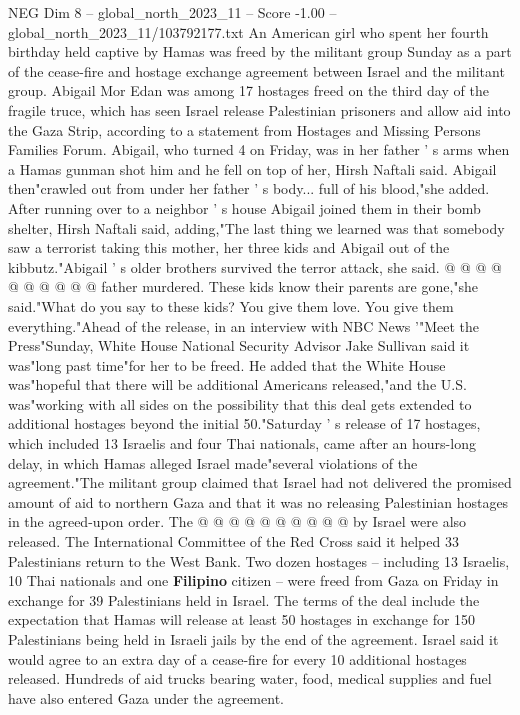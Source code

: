 \begin{textsample}{NEG Dim 8 – global\_north\_2023\_11 – Score -1.00 – global\_north\_2023\_11/103792177.txt}  \label{ex:f8_neg_265}
An American girl who spent her fourth birthday held captive by Hamas was freed by the militant group Sunday as a part of the cease-fire and hostage exchange agreement between Israel and the militant group.
Abigail Mor Edan was among 17 hostages freed on the third day of the fragile truce, which has seen Israel release Palestinian prisoners and allow aid into the Gaza Strip, according to a statement from Hostages and Missing Persons Families Forum.
Abigail, who turned 4 on Friday, was in her father ' s arms when a Hamas gunman shot him and he fell on top of her, Hirsh Naftali said.
Abigail then"crawled out from under her father ' s body... full of his blood,"she added.
After running over to a neighbor ' s house Abigail joined them in their bomb shelter, Hirsh Naftali said, adding,"The last thing we learned was that somebody saw a terrorist taking this mother, her three kids and Abigail out of the kibbutz."Abigail ' s older brothers survived the terror attack, she said. @ @ @ @ @ @ @ @ @ @ father murdered.
These kids know their parents are gone,"she said."What do you say to these kids?
You give them love.
You give them everything."Ahead of the release, in an interview with NBC News '"Meet the Press"Sunday, White House National Security Advisor Jake Sullivan said it was"long past time"for her to be freed.
He added that the White House was"hopeful that there will be additional Americans released,"and the U.S. was"working with all sides on the possibility that this deal gets extended to additional hostages beyond the initial 50."Saturday ' s release of 17 hostages, which included 13 Israelis and four Thai nationals, came after an hours-long delay, in which Hamas alleged Israel made"several violations of the agreement."The militant group claimed that Israel had not delivered the promised amount of aid to northern Gaza and that it was no releasing Palestinian hostages in the agreed-upon order.
The @ @ @ @ @ @ @ @ @ @ by Israel were also released.
The International Committee of the Red Cross said it helped 33 Palestinians return to the West Bank.
Two dozen hostages -- including 13 Israelis, 10 Thai nationals and one \textbf{Filipino} citizen -- were freed from Gaza on Friday in exchange for 39 Palestinians held in Israel.
The terms of the deal include the expectation that Hamas will release at least 50 hostages in exchange for 150 Palestinians being held in Israeli jails by the end of the agreement.
Israel said it would agree to an extra day of a cease-fire for every 10 additional hostages released.
Hundreds of aid trucks bearing water, food, medical supplies and fuel have also entered Gaza under the agreement.

\end{textsample}
